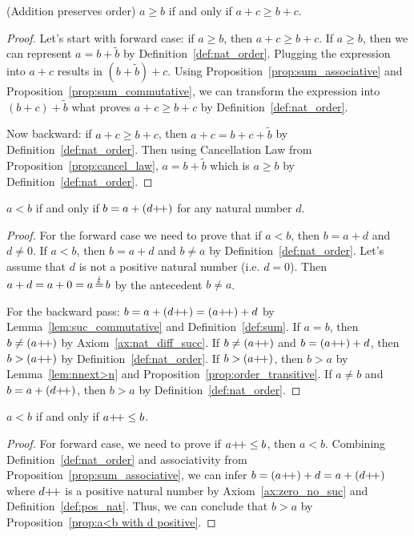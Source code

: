 \begin{subsequence}
    \begin{proposition}
        \textup{(Addition preserves order)}  $a \geq b$ if and only if $a + c \geq b + c$.\label{prop:sum_preserve_order}
    \end{proposition}
    \begin{proof}
        Let's start with forward case: if $a \geq b$, then $a+c \geq b+c$. If $a \geq b$, then we can represent $a=b+\tilde{b}$ by Definition~\ref{def:nat_order}. Plugging the expression into $a+c$ results in $(b+\tilde{b}) + c$. Using Proposition~\ref{prop:sum_associative} and Proposition~\ref{prop:sum_commutative}, we can transform the expression into $(b+c)+ \tilde{b}$ what proves $a+c \geq b+c$ by Definition~\ref{def:nat_order}. 
        
        Now backward: if $a+c\geq b +c$, then $a + c = b + c + \tilde{b}$ by Definition~\ref{def:nat_order}. Then using Cancellation Law from Proposition~\ref{prop:cancel_law}, $a=b + \tilde{b}$ which is $a\geq b$ by Definition~\ref{def:nat_order}.
    \end{proof}
    \begin{proposition}
        $a < b$ if and only if $b = a + (d\operatorname{\!+\!+})$ for any natural number $d$.\label{prop:a<b with d positive}
    \end{proposition}
    \begin{proof}
        For the forward case we need to prove that if $a < b$, then $b=a+d$ and $d\neq 0$. If $a < b$, then $b=a+d$ and $b\neq a$ by Definition~\ref{def:nat_order}. Let's assume that $d$ is not a positive natural number (i.e. $d=0$). Then $a+d=a+0=a\operatorname{\stackrel{\lightning}{=}} b$ by the antecedent $b\neq a$. 
        
        For the backward pass: $b=a+(d\operatorname{\!+\!+}) = (a\operatorname{\!+\!+}) + d$ by Lemma~\ref{lem:suc_commutative} and Definition~\ref{def:sum}. If $a=b$, then $b\neq (a\operatorname{\!+\!+})$ by Axiom~\ref{ax:nat_diff_succ}. If $b\neq (a\operatorname{\!+\!+})$ and $b=(a\operatorname{\!+\!+})+d$, then $b > (a\operatorname{\!+\!+})$ by Definition~\ref{def:nat_order}. If $b > (a\operatorname{\!+\!+})$, then $b>a$ by Lemma~\ref{lem:nnext>n} and Proposition~\ref{prop:order_transitive}. If $a\neq b$ and $b=a+(d\operatorname{\!+\!+})$, then $b>a$ by Definition~\ref{def:nat_order}.
    \end{proof}
    \begin{proposition}
        $a < b$ if and only if $a\operatorname{\!+\!+} \leq b$.\label{prop:order_anext_geq_b}
    \end{proposition}
    \begin{proof}
        For forward case, we need to prove if $a\operatorname{\!+\!+} \leq b$, then $a < b$. Combining Definition~\ref{def:nat_order} and associativity from Proposition~\ref{prop:sum_associative}, we can infer $b=(a\operatorname{\!+\!+})+d=a+(d\operatorname{\!+\!+})$ where $d\operatorname{\!+\!+}$ is a positive natural number by Axiom~\ref{ax:zero_no_suc} and Definition~\ref{def:pos_nat}. Thus, we can conclude that $b>a$ by Proposition~\ref{prop:a<b with d positive}. 
        

\end{proof}
\end{subsequence}

